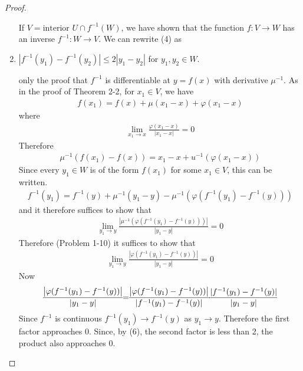 \begin{proof}
\begin{enumerate}[label={\upshape(\arabic*)}]
            If $V = \text{interior } U \cap f^{-1}(W)$, we have shown that the function 
            $f:V\to W$ has an inverse $f^{-1}:W\to V$. We can rewrite (4) as 
        \item $|f^{-1}(y_1) - f^{-1}(y_2)| \le 2|y_1 - y_2|$ for $y_1, y_2\in W$.\par 
            only the proof that $f^{-1}$ is differentiable at $y=f(x)$ with derivative 
            $\mu^{-1}$. As in the proof of Theorem 2-2, for $x_1\in V$, we have
            \begin{align*}
                f(x_1) = f(x) + \mu(x_1 - x) + \varphi(x_1 - x)
            \end{align*}
            where 
            \begin{align*}
                \lim_{x_1\to x}{\frac{\varphi(x_1 - x)}{|x_1 - x|}} = 0
            \end{align*}
            Therefore 
            \begin{align*}
                \mu^{-1}\left(f(x_1) - f(x)\right) = x_1 - x + u^{-1}\left(\varphi(x_1 - x)\right)
            \end{align*}
            Since every $y_1\in W$ is of the form $f(x_1)$ for some $x_1\in V$, this can be written.
            \begin{align*}
                f^{-1}(y_1) = f^{-1}(y) + \mu^{-1}(y_1 - y) - \mu^{-1}\left(\varphi(f^{-1}(y_1) - f^{-1}(y))\right)
            \end{align*}
            and it therefore suffices to show that
            \begin{align*}
                \lim_{y_1\to y}\frac{\left|\mu^{-1}(\varphi(f^{-1}(y_1)-f^{-1}(y)))\right|}{|y_1-y|} = 0   
            \end{align*}
            Therefore (Problem 1-10) it suffices to show that
            \begin{align*}
                \lim_{y_1\to y}\frac{\left|\varphi(f^{-1}(y_1)-f^{-1}(y))\right|}{|y_1-y|}=0
            \end{align*}
            Now 
            \begin{align*}
                \frac{\left|\varphi(f^{-1}(y_1)-f^{-1}(y))\right|}{|y_1-y|}
                \hspace*{-4pt}=\hspace*{-4pt} 
                \frac{\left|\varphi(f^{-1}(y_1)-f^{-1}(y))\right|}{|f^{-1}(y_1) - f^{-1}(y)|}
                \hspace*{-4pt}\cdot\hspace*{-4pt} 
                \frac{|f^{-1}(y_1) - f^{-1}(y)|}{|y_1-y|} 
            \end{align*}
            Since $f^{-1}$ is continuous $f^{-1}(y_1) \to f^{-1}(y)$ as $y_1\to y$. Therefore 
            the first factor approaches 0. Since, by (6), the second factor is less than 2, 
            the product also approaches 0.
    \end{enumerate}
\end{proof}

